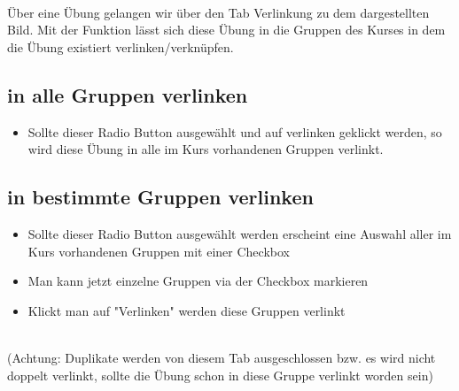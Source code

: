 ~\\Über eine Übung gelangen wir über den Tab Verlinkung zu dem dargestellten Bild. 
Mit der Funktion lässt sich diese Übung in die Gruppen des Kurses in dem die Übung existiert verlinken/verknüpfen. 
\newpage
\subsection*{in alle Gruppen verlinken}
\begin{itemize}
	\item Sollte dieser Radio Button ausgewählt und auf verlinken geklickt werden, so wird diese Übung in alle im Kurs vorhandenen Gruppen verlinkt. 
\end{itemize}

\subsection*{in bestimmte Gruppen verlinken}
\begin{itemize}
	\item Sollte dieser Radio Button ausgewählt werden erscheint eine Auswahl aller im Kurs vorhandenen Gruppen mit einer Checkbox
	\item Man kann jetzt einzelne Gruppen via der Checkbox markieren
	\item Klickt man auf "Verlinken" werden diese Gruppen verlinkt
\end{itemize}

~\\(Achtung: Duplikate werden von diesem Tab ausgeschlossen bzw. es wird nicht doppelt verlinkt, sollte die Übung schon in diese Gruppe verlinkt worden sein) 
\clearpage